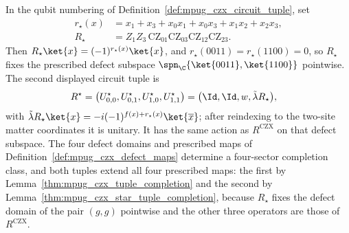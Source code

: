 \begin{definition}
    \label{def:mpug_czx_star_tuple}
    \leanok
    In the qubit numbering of Definition~\ref{def:mpug_czx_circuit_tuple}, set
    \begin{align}
        r_\star(x) & =x_1+x_3+x_0x_1+x_0x_3+x_1x_2+x_2x_3,
        \label{eq:mpug_czx_star_phase}                                         \\
        R_\star    & =Z_1Z_3\,\mathrm{CZ}_{01}\mathrm{CZ}_{03}\mathrm{CZ}_{12}
        \mathrm{CZ}_{23}.
        \label{eq:mpug_czx_star_gate}
    \end{align}
    Then $R_\star\ket{x}=(-1)^{r_\star(x)}\ket{x}$, and
    $r_\star(0011)=r_\star(1100)=0$, so $R_\star$ fixes the prescribed defect
    subspace $\spn_{\C}\{\ket{0011},\ket{1100}\}$ pointwise. The second
    displayed circuit tuple is
    \begin{align}
        R^\star
         & =\bigl(U^\star_{0,0},U^\star_{0,1},U^\star_{1,0},U^\star_{1,1}\bigr)
        =\bigl(\Id,\Id,w,\tilde\lambda R_\star\bigr),
        \label{eq:mpug_czx_star_tuple}
    \end{align}
    with
    $\tilde\lambda R_\star\ket{x}=-i(-1)^{f(x)+r_\star(x)}\ket{\overline x}$;
    after reindexing to the two-site matter coordinates it is unitary. It has the
    same action as $R^{\mathrm{CZX}}$ on that defect subspace. The four defect
    domains and prescribed maps of
    Definition~\ref{def:mpug_czx_defect_maps} determine a four-sector
    completion class, and both tuples extend all four prescribed maps: the
    first by Lemma~\ref{thm:mpug_czx_tuple_completion} and the second by
    Lemma~\ref{thm:mpug_czx_star_tuple_completion}, because $R_\star$ fixes
    the defect domain of the pair $(g,g)$ pointwise and the other three
    operators are those of $R^{\mathrm{CZX}}$.
\end{definition}

